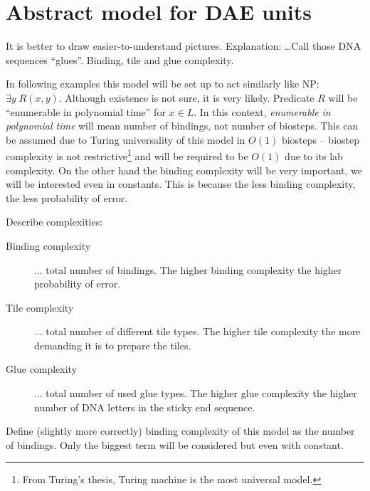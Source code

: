 \section{Abstract model for DAE units}

It is better to draw easier-to-understand pictures. Explanation: \ldots Call those DNA sequences ``glues''. Binding, tile and glue complexity.

In following examples this model will be set up to act similarly like NP: $\exists y \; R(x,y)$. Although existence is not sure, it is very likely. Predicate $R$ will be ``enumerable in polynomial time'' for $x \in L$. In this context, {\em enumerable in polynomial time} will mean number of bindings, not number of biosteps. This can be assumed due to Turing universality of this model in $O(1)$ biosteps -- biostep complexity is not restrictive\footnote{From Turing's thesis, Turing machine is the most universal model.} and will be required to be $O(1)$ due to its lab complexity. On the other hand the binding complexity will be very important, we will be interested even in constants. This is because the less binding complexity, the less probability of error.

Describe complexities:
\begin{description}
	\item[Binding complexity] ... total number of bindings. The higher binding complexity the higher probability of error.
	\item[Tile complexity] ... total number of different tile types. The higher tile complexity the more demanding it is to prepare the tiles.
	\item[Glue complexity] ... total number of used glue types. The higher glue complexity the higher number of DNA letters in the sticky end sequence. %
\end{description}


Define (slightly more correctly) binding complexity of this model as the number of bindings. Only the biggest term will be considered but even with constant.

